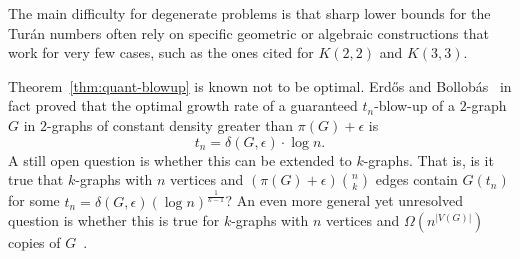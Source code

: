 The main difficulty for degenerate problems is that sharp lower bounds for the Turán numbers
often rely on specific geometric or algebraic constructions that work for very few cases,
such as the ones cited for $K(2, 2)$ and $K(3, 3)$.

Theorem~\ref{thm:quant-blowup} is known not to be optimal.
Erdős and Bollobás~\cite{bollobas1973structure} in fact proved that the optimal growth
rate of a guaranteed $t_n$-blow-up of a $2$-graph $G$ in $2$-graphs of constant density greater than $\pi(G) + \epsilon$ is
\[
    t_n = \delta(G, \epsilon) \cdot \log n.
\]
A still open question is whether this can be extended to $k$-graphs.
That is, is it true that $k$-graphs with $n$ vertices and  $\left(\pi(G) + \epsilon \right)  \binom{n}{k}$ edges
contain $G(t_n)$ for some $t_n = \delta(G, \epsilon) (\log n)^{\frac{1}{k-1}}$?
An even more general yet unresolved question is whether this is true for
$k$-graphs with $n$ vertices and $\Omega (n^{|V(G)|})$ copies of $G$~\cite{rodl2012complete}.